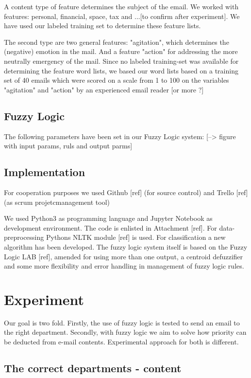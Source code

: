 \documentclass[journal]{IEEEtran}
\begin{document}
    A content type of feature determines the subject of the email. We worked with features: personal, financial, space, tax and ...[to confirm after experiment]. We have used our labeled training set to determine these feature lists. 
    
    The second type are two general features: "agitation", which determines the (negative) emotion in the mail. And a feature "action" for addressing the more neutrally emergency of the mail. Since no labeled training-set was available for determining the feature word lists, we based our word lists based on a training set of 40 emails which were scored on a scale from 1 to 100 on the variables "agitation" and "action" by an experienced email reader [or more ?]  
    
\subsection{Fuzzy Logic}
    
    The following parameters have been set in our Fuzzy Logic system: 
    [--> figure with input params, ruls and output parms]


\subsection{Implementation}
For cooperation purposes we used Github [ref] (for source control) and Trello [ref] (as scrum projetcmanagement tool)

We used Python3 as programming language and Jupyter Notebook as development 
environment. The code is enlisted in Attachment [ref]. For data-preprocessing Pythons NLTK module [ref] is used. For classification a new algorithm has been developed. The fuzzy logic system itself is based on the Fuzzy Logic LAB [ref], amended for using more than one output, a centroid defuzzifier and some more flexibility and error handling in management of fuzzy logic rules. 
    
\section{Experiment}

Our goal is two fold. Firstly, the use of fuzzy logic is tested to send an email to the right department. Secondly, with fuzzy logic we aim to solve how priority can be deducted from e-mail contents. Experimental approach for both is different. 

\subsection{The correct departments - content}
\end{document}
